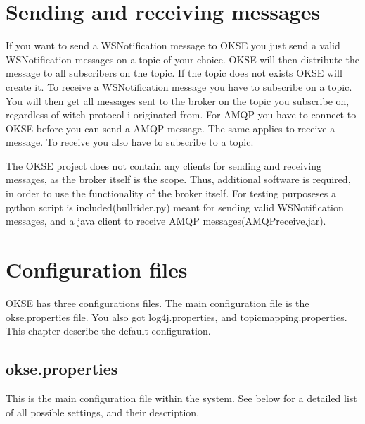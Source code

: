 \section{Sending and receiving messages}

If you want to send a WSNotification message to OKSE you just send a valid WSNotification messages on a topic of your choice. OKSE will then distribute the message to all subscribers on the topic. If the topic does not exists OKSE will create it. To receive a WSNotification message you have to subscribe on a topic. You will then get all messages sent to the broker on the topic you subscribe on, regardless of witch protocol i originated from. For AMQP you have to connect to OKSE before you can send a AMQP message. The same applies to receive a message. To receive you also have to subscribe to a topic. 

The OKSE project does not contain any clients for sending and receiving messages, as the broker itself is the scope. Thus, additional software is required, in order to use the functionality of the broker itself. For testing purposeses a python script is included(bullrider.py) meant for sending valid WSNotification messages, and a java client to receive AMQP messages(AMQPreceive.jar).

\section{Configuration files}
\label{sec:configuration-files}
OKSE has three configurations files. The main configuration file is the okse.properties file. You also got log4j.properties, and topicmapping.properties. This chapter describe the default configuration.

\subsection{okse.properties}
\label{subsec:okse.properties}
 
 This is the main configuration file within the system. See below for a detailed list of all possible settings, and their description.

